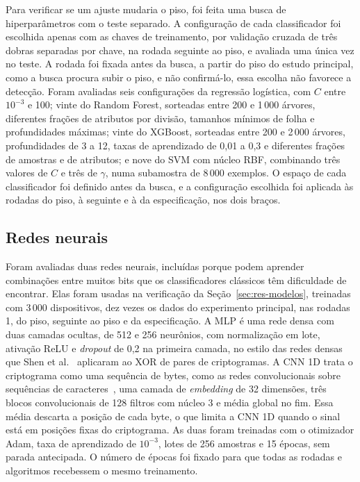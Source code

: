 Para verificar se um ajuste mudaria o piso, foi feita uma busca de hiperparâmetros com o teste separado. A configuração de cada classificador foi escolhida apenas com as chaves de treinamento, por validação cruzada de três dobras separadas por chave, na rodada seguinte ao piso, e avaliada uma única vez no teste. A rodada foi fixada antes da busca, a partir do piso do estudo principal, como a busca procura subir o piso, e não confirmá-lo, essa escolha não favorece a detecção. Foram avaliadas seis configurações da regressão logística, com $C$ entre $10^{-3}$ e 100; vinte do Random Forest, sorteadas entre 200 e 1\,000 árvores, diferentes frações de atributos por divisão, tamanhos mínimos de folha e profundidades máximas; vinte do XGBoost, sorteadas entre 200 e 2\,000 árvores, profundidades de 3 a 12, taxas de aprendizado de 0,01 a 0,3 e diferentes frações de amostras e de atributos; e nove do SVM com núcleo RBF, combinando três valores de $C$ e três de $\gamma$, numa subamostra de 8\,000 exemplos. O espaço de cada classificador foi definido antes da busca, e a configuração escolhida foi aplicada às rodadas do piso, à seguinte e à da especificação, nos dois braços.

\subsection{Redes neurais}
\label{sec:met-redes}

Foram avaliadas duas redes neurais, incluídas porque podem aprender combinações entre muitos bits que os classificadores clássicos têm dificuldade de encontrar. Elas foram usadas na verificação da Seção~\ref{sec:res-modelos}, treinadas com 3\,000 dispositivos, dez vezes os dados do experimento principal, nas rodadas 1, do piso, seguinte ao piso e da especificação. A MLP é uma rede densa com duas camadas ocultas, de 512 e 256 neurônios, com normalização em lote, ativação ReLU e \textit{dropout} de 0,2 na primeira camada, no estilo das redes densas que Shen et al.~\cite{Shen2024ND} aplicaram ao XOR de pares de criptogramas. A CNN 1D trata o criptograma como uma sequência de bytes, como as redes convolucionais sobre sequências de caracteres~\cite{Zhang2015CharCNN}, uma camada de \textit{embedding} de 32 dimensões, três blocos convolucionais de 128 filtros com núcleo 3 e média global no fim. Essa média descarta a posição de cada byte, o que limita a CNN 1D quando o sinal está em posições fixas do criptograma. As duas foram treinadas com o otimizador Adam, taxa de aprendizado de $10^{-3}$, lotes de 256 amostras e 15 épocas, sem parada antecipada. O número de épocas foi fixado para que todas as rodadas e algoritmos recebessem o mesmo treinamento.

